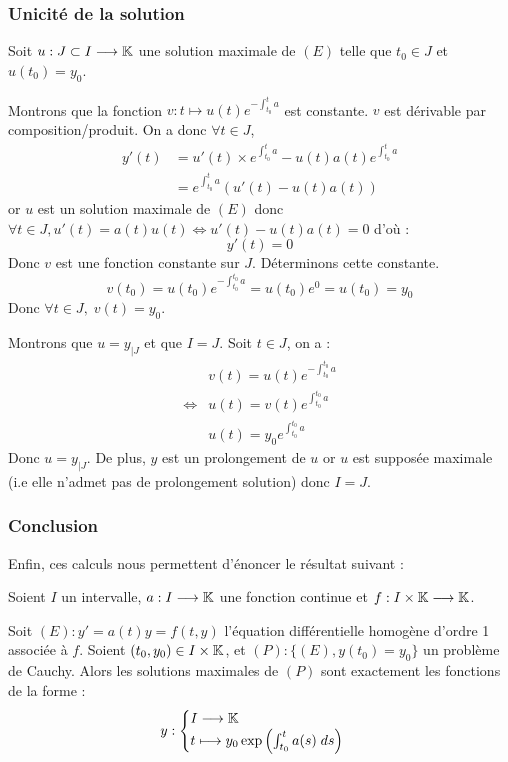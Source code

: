 \subsubsection{Unicité de la solution}

Soit $u : J \subset I \longrightarrow \mathbb{K}$ une solution maximale de $(E)$ telle que $t_0 \in J$ et $u(t_0) = y_0$. 

Montrons que la fonction $v : t \longmapsto u(t) e^{ - \int_{t_0}^{t} a}$ est constante. 
$v$ est dérivable par composition/produit. On a donc $ \forall t \in J$, 
    \begin{align*}
        y'(t) &= u'(t) \times e^{ \int_{t_0}^{t} a} - u(t)a(t)e^{ \int_{t_0}^{t} a} \\ 
              &= e^{ \int_{t_0}^{t} a} (u'(t) - u(t)a(t))
    \end{align*}
or $u$ est un solution maximale de $(E)$ donc $ \forall t \in J, u'(t) = a(t)u(t) \iff u'(t) - u(t)a(t) = 0$ d'où :
    \[ y'(t) = 0 \] 
Donc $v$ est une fonction constante sur $J$. Déterminons cette constante. 
    \[ v(t_0) = u(t_0) e^{ - \int_{t_0}^{t_0} a} = u(t_0)e^0 = u(t_0) = y_0 \] 
Donc $ \forall t \in J, \; v(t) = y_0 $. 

Montrons que $u = y_{ |J}$ et que $I = J$. Soit $t \in J$, on a :
    \begin{align*}
        & v(t) = u(t) e^{ - \int_{t_0}^{t_0} a} \\ 
        \iff & u(t) = v(t) e^{ \int_{t_0}^{t_0} a} \\ 
        & u(t) = y_0 e^{ \int_{t_0}^{t_0} a} 
    \end{align*}
Donc $u = y_{ |J}$. De plus, $y$ est un prolongement de $u$ or $u$ est supposée maximale (i.e elle n'admet pas de prolongement solution)
donc $I = J$. 

\subsubsection{Conclusion}

Enfin, ces calculs nous permettent d'énoncer le résultat suivant : 

\begin{theorem}
    Soient $I$ un intervalle, $a : I \longrightarrow \mathbb{K}$ une fonction continue et $f : I \times \mathbb{K} \longrightarrow \mathbb{K}$. 

    Soit $(E) : y' = a(t)y = f(t,y)$ l'équation différentielle homogène d'ordre 1 associée à $f$. 
    Soient $(t_0, y_0) \in I \times \mathbb{K}$, et $(P) : \{(E), y(t_0) = y_0\}$ un problème de Cauchy. 
    Alors les solutions maximales de $(P)$ sont exactement les fonctions de la forme : 
        \[ y : 
            \begin{cases}
                I \longrightarrow \mathbb{K} \\ 
                t \longmapsto y_0 \exp \left( \int_{t_0}^{t} a(s) \; ds \right)
            \end{cases}
        \] 
\end{theorem}

